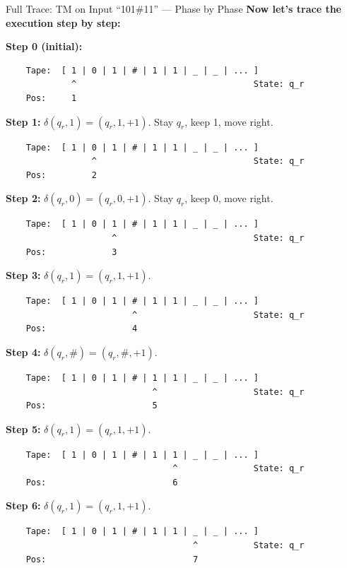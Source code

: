\documentclass[11pt,a4paper]{article}
\begin{document}
\begin{examplebox}{Full Trace: TM on Input ``101\#11'' --- Phase by Phase}
\vspace{0.5em}
\textbf{Now let's trace the execution step by step:}

\textbf{Step 0 (initial):}
\begin{lstlisting}
    Tape:  [ 1 | 0 | 1 | # | 1 | 1 | _ | _ | ... ]
             ^                                   State: q_r
    Pos:     1
\end{lstlisting}

\textbf{Step 1:} $\delta(q_r, 1) = (q_r, 1, +1)$. Stay $q_r$, keep 1, move right.
\begin{lstlisting}
    Tape:  [ 1 | 0 | 1 | # | 1 | 1 | _ | _ | ... ]
                 ^                               State: q_r
    Pos:         2
\end{lstlisting}

\textbf{Step 2:} $\delta(q_r, 0) = (q_r, 0, +1)$. Stay $q_r$, keep 0, move right.
\begin{lstlisting}
    Tape:  [ 1 | 0 | 1 | # | 1 | 1 | _ | _ | ... ]
                     ^                           State: q_r
    Pos:             3
\end{lstlisting}

\textbf{Step 3:} $\delta(q_r, 1) = (q_r, 1, +1)$.
\begin{lstlisting}
    Tape:  [ 1 | 0 | 1 | # | 1 | 1 | _ | _ | ... ]
                         ^                       State: q_r
    Pos:                 4
\end{lstlisting}

\textbf{Step 4:} $\delta(q_r, \#) = (q_r, \#, +1)$.
\begin{lstlisting}
    Tape:  [ 1 | 0 | 1 | # | 1 | 1 | _ | _ | ... ]
                             ^                   State: q_r
    Pos:                     5
\end{lstlisting}

\textbf{Step 5:} $\delta(q_r, 1) = (q_r, 1, +1)$.
\begin{lstlisting}
    Tape:  [ 1 | 0 | 1 | # | 1 | 1 | _ | _ | ... ]
                                 ^               State: q_r
    Pos:                         6
\end{lstlisting}

\textbf{Step 6:} $\delta(q_r, 1) = (q_r, 1, +1)$.
\begin{lstlisting}
    Tape:  [ 1 | 0 | 1 | # | 1 | 1 | _ | _ | ... ]
                                     ^           State: q_r
    Pos:                             7
\end{lstlisting}


\end{examplebox}
\end{document}
